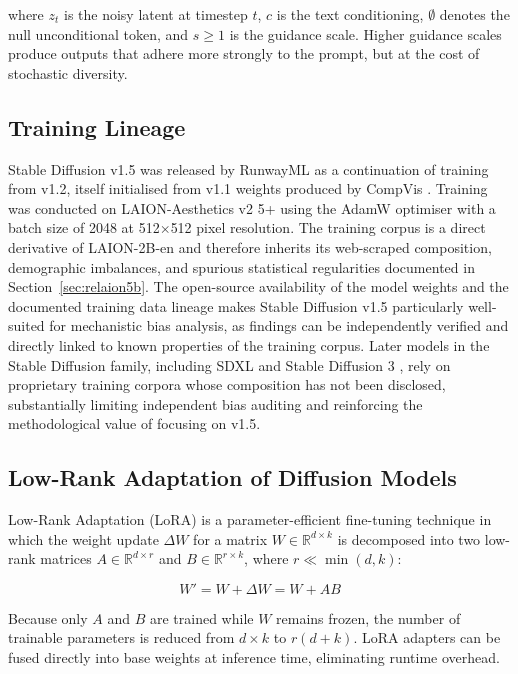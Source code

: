 where $z_t$ is the noisy latent at timestep $t$, $c$ is the text conditioning,
$\emptyset$ denotes the null unconditional token, and $s \geq 1$ is the guidance scale.
Higher guidance scales produce outputs that adhere more strongly to the prompt, but at the
cost of stochastic diversity.

\subsection*{Training Lineage}
\label{subsec:training_lineage}

Stable Diffusion v1.5 was released by RunwayML as a continuation of training from v1.2,
itself initialised from v1.1 weights produced by CompVis \cite{StableDiffusion_2022_SD15modelcard}. Training was conducted on LAION-Aesthetics v2 5+ using the AdamW optimiser with a batch size of 2048 at 512$\times$512 pixel resolution. The training corpus is a direct derivative of LAION-2B-en and therefore inherits its
web-scraped composition, demographic imbalances, and spurious statistical regularities documented in Section~\ref{sec:relaion5b}. The open-source availability of the model weights and the documented training data lineage makes Stable Diffusion v1.5 particularly well-suited for mechanistic bias analysis, as findings can be independently verified and directly linked to known properties of the training corpus. Later models in the Stable Diffusion family, including SDXL \cite{Podell_2023_SDXL} and Stable Diffusion 3 \cite{Esser_2024_SD3}, rely on proprietary training corpora whose composition has not been disclosed, substantially limiting independent bias auditing and reinforcing the methodological value of focusing on v1.5.

\subsection{Low-Rank Adaptation of Diffusion Models}
\label{subsec:lora}

Low-Rank Adaptation (LoRA) \cite{Hu_2021_LoRA} is a parameter-efficient fine-tuning
technique in which the weight update $\Delta W$ for a matrix $W \in \mathbb{R}^{d \times
		k}$ is decomposed into two low-rank matrices $A \in \mathbb{R}^{d \times r}$ and $B \in
	\mathbb{R}^{r \times k}$, where $r \ll \min(d, k)$:

\[
	W' = W + \Delta W = W + AB
\]

Because only $A$ and $B$ are trained while $W$ remains frozen, the number of trainable
parameters is reduced from $d \times k$ to $r(d + k)$. LoRA adapters can be fused
directly into base weights at inference time, eliminating runtime overhead.

